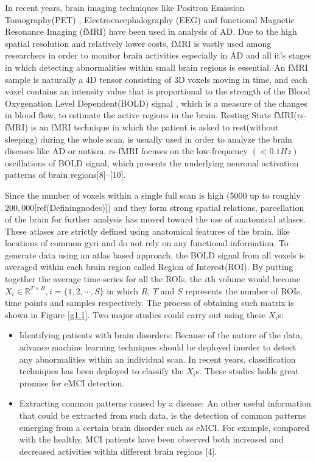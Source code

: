 \documentclass[journal]{IEEEtran}
\begin{document}
	
	In recent years, brain imaging techniques like Positron Emission Tomography(PET) \cite{r21}, Electroencephalography (EEG)\cite{r22} and functional Magnetic Resonance Imaging (fMRI)\cite{r23} have been used in analysis of AD. Due to the high spatial resolution and relatively lower costs, fMRI is vastly used among researchers in order to monitor brain activities especially in AD and all it's stages in which detecting abnormalities within small brain regions is essential. 
	An fMRI sample is naturally a 4D tensor consisting of 3D voxels moving in time, and each voxel contains an intensity value that is proportional to the strength of the Blood Oxygenation Level Dependent(BOLD) signal , which is a measure of the changes in blood flow, to estimate the active regions in the brain\cite{r07}.
	Resting State fMRI(rs-fMRI) is an fMRI technique in which the patient is asked to rest(without sleeping) during the whole scan, is usually used in order to analyze the brain diseases like AD or autism. rs-fMRI focuses on the low-frequency $\left( < 0.1 Hz \right)$  oscillations of BOLD signal, which presents the underlying neuronal activation patterns of brain regions[8]–[10]. 
	
Since the number of voxels within a single full scan is high 
($5000$ up to roughly $200,000$[ref(Definingnodes)]) and they form strong spatial relations, parcellation of the brain for further analysis has moved toward the use
of anatomical atlases. These atlases are strictly defined using
anatomical features of the brain, like locations of common gyri
and do not rely on any functional information. To generate data
using an atlas based approach, the BOLD signal from all voxels is averaged within each brain region called Region of Interest(ROI).
By putting together the average time-series for all the ROIs, the $i$th volume would become $X_i \in \mathbb{R}^{T \times R} , i = \{1,2,\cdots, S\}$ in which $R$, $T$ and $S$ represents the number of ROIs, time points and samples respectively. The process of obtaining such matrix is shown in Figure \eqref{g1.1}. 
Two major studies could carry out using these  $X_i$s: 
\begin{itemize}
	\item Identifying patients with brain disorders: Because of the nature of the data, advance machine learning techniques should be deployed inorder to detect any abnormalities within an individual scan. 
	In recent years, classification techniques has been deployed  to classify the $X_i$s. These studies holds great promise for eMCI detection.     
	\item Extracting common patterns caused by a disease: An other useful information that could be extracted from such data, is the detection of common patterns emerging from a certain brain disorder such as eMCI. For example, compared with the healthy,  MCI patients have been observed both increased and decreased activities within  different brain regions [4].
\end{itemize}
\end{document}
